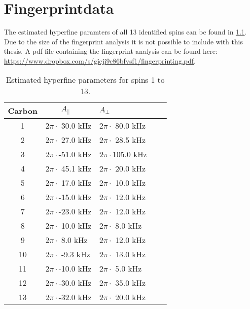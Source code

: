 \chapter{Fingerprintdata}
\label{chap:Fingerprint_data_appendix}
The estimated hyperfine paramters of all 13 identified spins can be found in \cref{tbl:HF_par_appendix}. Due to the size of the fingerprint analysis it is not possible to include with this thesis. A pdf file containing the fingerprint analysis can be found here: \url{https://www.dropbox.com/s/gieji9e86bfvsf1/fingerprinting.pdf}.

\begin{table}[htbp]
    \centering
    \begin{tabular}{cllll}
    Carbon &  $\quad \quad A_{\parallel} $ &\quad \quad  $A_{\perp}$ \\ \hline
    1 & 2$\pi \cdot ${ }30.0 kHz & 2$\pi \cdot ${ }80.0 kHz \\
    2 & 2$\pi \cdot ${ }27.0 kHz & 2$\pi \cdot ${ }28.5 kHz \\
    3 & 2$\pi \cdot $-51.0 kHz & 2$\pi \cdot $105.0 kHz \\
    4 & 2$\pi \cdot ${ }45.1 kHz & 2$\pi \cdot ${ }20.0 kHz \\
    5 & 2$\pi \cdot ${ }17.0 kHz & 2$\pi \cdot ${ }10.0 kHz \\
    6 & 2$\pi \cdot $-15.0 kHz & 2$\pi \cdot ${ }12.0 kHz \\
    7 & 2$\pi \cdot $-23.0 kHz & 2$\pi \cdot ${ }12.0 kHz \\
    8 & 2$\pi \cdot ${ }10.0 kHz & 2$\pi \cdot ${ }{ }8.0 kHz \\
    9 & 2$\pi \cdot ${ }{ }8.0 kHz & 2$\pi \cdot ${ }12.0 kHz \\
    10 & 2$\pi \cdot ${ }-9.3 kHz & 2$\pi \cdot ${ }13.0 kHz \\
    11 & 2$\pi \cdot $-10.0 kHz & 2$\pi \cdot ${ }{ }5.0 kHz \\
    12 & 2$\pi \cdot $-30.0 kHz & 2$\pi \cdot ${ }35.0 kHz \\
    13 & 2$\pi \cdot $-32.0 kHz & 2$\pi \cdot ${ }20.0 kHz \\
    \end{tabular}
    \caption{Estimated hyperfine parameters for spins 1 to 13.}
    \label{tbl:HF_par_appendix}
\end{table}
